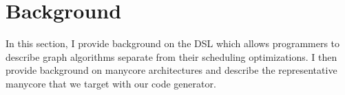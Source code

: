 \chapter{Background}\label{gen:sec:background}

In this section, I provide background on the \graphit DSL which allows programmers to describe graph algorithms separate from their scheduling optimizations.
I then provide background on manycore architectures and describe the representative manycore that we target with our code generator. 





